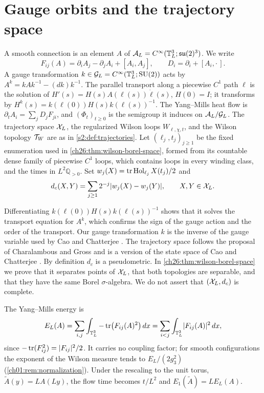 \section{Gauge orbits and the trajectory space}\label{ch01:sec:orbits}

\begin{definition}\label{ch01:def:orbit-space}
A smooth connection is an element $A$ of $\mathcal A_L=C^\infty(\mathbb T_L^3;\mathfrak{su}(2)^3)$. We write
\[
 F_{ij}(A)=\partial_iA_j-\partial_jA_i+[A_i,A_j],\qquad D_i=\partial_i+[A_i,\cdot\,].
\]
A gauge transformation $k\in\mathcal G_L=C^\infty(\mathbb T_L^3;\mathrm{SU}(2))$ acts by $A^k=kAk^{-1}-(dk)k^{-1}$. The parallel transport along a piecewise $C^1$ path $\ell$ is the solution of $H'(s)=H(s)A(\ell(s))\dot\ell(s)$, $H(0)=I$; it transforms by $H^k(s)=k(\ell(0))H(s)k(\ell(s))^{-1}$. The Yang--Mills heat flow is $\partial_tA_i=\sum_jD_jF_{ji}$, and $(\Phi_t)_{t\ge0}$ is the semigroup it induces on $\mathcal A_L/\mathcal G_L$. The trajectory space $\mathcal X_L$, the regularized Wilson loops $W_{\ell,\chi,t}$, and the Wilson topology $\mathcal T_W$ are as in \cref{s2:def:trajectories}. Let $(\ell_j,t_j)_{j\ge1}$ be the fixed enumeration used in \cref{ch26:thm:wilson-borel-space}, formed from its countable dense family of piecewise $C^1$ loops, which contains loops in every winding class, and the times in $L^2\mathbb Q_{>0}$. Set $w_j(X)=\operatorname{tr}\operatorname{Hol}_{\ell_j}X(t_j)/2$ and
\[
 d_c(X,Y)=\sum_{j\ge1}2^{-j}\lvert w_j(X)-w_j(Y)\rvert,\qquad X,Y\in\mathcal X_L.
\]
\end{definition}

Differentiating $k(\ell(0))H(s)k(\ell(s))^{-1}$ shows that it solves the transport equation for $A^k$, which confirms the sign of the gauge action and the order of the transport. Our gauge transformation $k$ is the inverse of the gauge variable used by Cao and Chatterjee \cite[(1.1), p.~2]{CCState2023v4}. The trajectory space follows the proposal of Charalambous and Gross \cite{CharalambousGross2013} and is a version of the state space of Cao and Chatterjee \cite{CCState2023v4}. By definition $d_c$ is a pseudometric. In \cref{ch26:thm:wilson-borel-space} we prove that it separates points of $\mathcal X_L$, that both topologies are separable, and that they have the same Borel $\sigma$-algebra. We do not assert that $(\mathcal X_L,d_c)$ is complete.

The Yang--Mills energy is
\[
 E_L(A)=\sum_{i,j}\int_{\mathbb T_L^3}-\operatorname{tr}\bigl(F_{ij}(A)^2\bigr)\,dx=\sum_{i<j}\int_{\mathbb T_L^3}\lvert F_{ij}(A)\rvert^2\,dx,
\]
since $-\operatorname{tr}(F_{ij}^2)=\lvert F_{ij}\rvert^2/2$. It carries no coupling factor; for smooth configurations the exponent of the Wilson measure tends to $E_L/(2g_3^2)$ (\cref{ch01:rem:normalization}). Under the rescaling to the unit torus, $\widetilde A(y)=LA(Ly)$, the flow time becomes $t/L^2$ and $E_1(\widetilde A)=LE_L(A)$.

